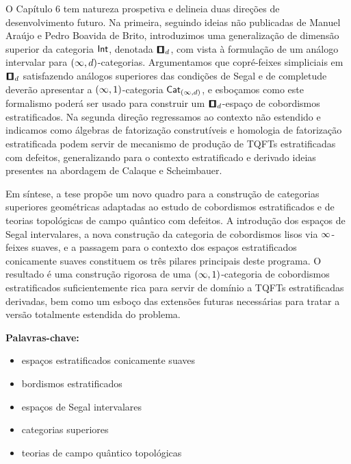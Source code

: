 O Capítulo 6 tem natureza prospetiva e delineia duas direções de desenvolvimento futuro. Na primeira, seguindo ideias não publicadas de Manuel Araújo e Pedro Boavida de Brito, introduzimos uma generalização de dimensão superior da categoria $\operatorname{\mathsf{Int}}$, denotada $\cube_d$, com vista à formulação de um análogo intervalar para $(\operatorname{\infty},d)$-categorias. Argumentamos que copré-feixes simpliciais em $\cube_d$ satisfazendo análogos superiores das condições de Segal e de completude deverão apresentar a $(\operatorname{\infty},1)$-categoria $\operatorname{{\sf Cat}}_{(\operatorname{\infty},d)}$, e esboçamos como este formalismo poderá ser usado para construir um $\cube_d$-espaço de cobordismos estratificados. Na segunda direção regressamos ao contexto não estendido e indicamos como álgebras de fatorização construtíveis e homologia de fatorização estratificada podem servir de mecanismo de produção de TQFTs estratificadas com defeitos, generalizando para o contexto estratificado e derivado ideias presentes na abordagem de Calaque e Scheimbauer.

Em síntese, a tese propõe um novo quadro para a construção de categorias superiores geométricas adaptadas ao estudo de cobordismos estratificados e de teorias topológicas de campo quântico com defeitos. A introdução dos espaços de Segal intervalares, a nova construção da categoria de cobordismos lisos via $\operatorname{\infty}$-feixes suaves, e a passagem para o contexto dos espaços estratificados conicamente suaves constituem os três pilares principais deste programa. O resultado é uma construção rigorosa de uma $(\operatorname{\infty},1)$-categoria de cobordismos estratificados suficientemente rica para servir de domínio a TQFTs estratificadas derivadas, bem como um esboço das extensões futuras necessárias para tratar a versão totalmente estendida do problema.

\bigskip

\begin{samepage}
\noindent\textbf{Palavras-chave:}
\begin{itemize}[nosep]
    \item espaços estratificados conicamente suaves
    \item bordismos estratificados
    \item espaços de Segal intervalares
    \item categorias superiores
    \item teorias de campo quântico topológicas
\end{itemize}
\end{samepage}
